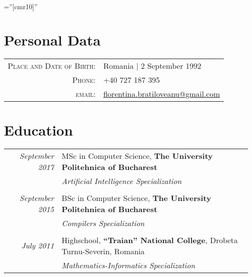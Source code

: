 \documentclass[a4paper,10pt]{article} %
\begin{document}
\pagestyle{empty} %

\font\fb=''[cmr10]'' %

\par{\bigskip\par} %

\section{Personal Data}

\begin{tabular}{rl}
\textsc{Place and Date of Birth:} & Romania  | 2 September 1992 \\
\textsc{Phone:} & +40 727 187 395\\
\textsc{email:} & \href{mailto:florentina.bratiloveanu@gmail.com}{florentina.bratiloveanu@gmail.com}
\end{tabular}


\section{Education}

\begin{tabular}{rl}	
\emph{September 2017} & MSc in Computer Science, \textbf{The University Politehnica of Bucharest}\\
& \textit{Artificial Intelligence Specialization}\\
&\\
\emph{September 2015} & BSc in Computer Science, \textbf{The University Politehnica of Bucharest}\\
& \textit{Compilers Specialization}\\
&\\

\emph{July 2011} & Highschool, \textbf{“Traian” National College}, Drobeta Turnu-Severin, Romania\\
& \textit{Mathematics-Informatics Specialization}\\
\end{tabular}
\end{document}
